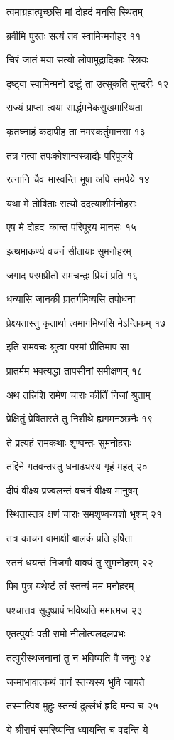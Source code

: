 त्वमाग्रहात्पृच्छसि मां दोहदं मनसि स्थितम्

ब्रवीमि पुरतः सत्यं तव स्वामिन्मनोहर ११

चिरं जातं मया सत्यो लोपामुद्रादिकाः स्त्रियः

दृष्ट्वा स्वामिन्मनो द्रष्टुं ता उत्सुकति सुन्दरीः १२

राज्यं प्राप्ता त्वया सार्द्धमनेकसुखमास्थिता

कृतघ्नाहं कदापीह ता नमस्कर्तुमानसा १३

तत्र गत्वा तपःकोशान्वस्त्राद्यैः परिपूजये

रत्नानि चैव भास्वन्ति भूषा अपि समर्पये १४

यथा मे तोषिताः सत्यो ददत्याशीर्मनोहराः

एष मे दोहदः कान्त परिपूरय मानसः १५

इत्थमाकर्ण्य वचनं सीतायाः सुमनोहरम्

जगाद परमप्रीतो रामचन्द्रः प्रियां प्रति १६

धन्यासि जानकी प्रातर्गमिष्यसि तपोधनाः

प्रेक्ष्यतास्तु कृतार्था त्वमागमिष्यसि मेऽन्तिकम् १७

इति रामवचः श्रुत्वा परमां प्रीतिमाप सा

प्रातर्मम भवत्यद्धा तापसीनां समीक्षणम् १८

अथ तन्निशि रामेण चाराः कीर्तिं निजां श्रुताम्

प्रेक्षितुं प्रेषितास्ते तु निशीथे ह्यगमनञ्छनैः १९

ते प्रत्यहं रामकथाः शृण्वन्तः सुमनोहराः

तद्दिने गतवन्तस्तु धनाढ्यस्य गृहं महत् २०

दीपं वीक्ष्य प्रज्वलन्तं वचनं वीक्ष्य मानुषम्

स्थितास्तत्र क्षणं चाराः समशृण्वन्यशो भृशम् २१

तत्र काचन वामाक्षी बालकं प्रति हर्षिता

स्तनं धयन्तं निजगौ वाक्यं तु सुमनोहरम् २२

पिब पुत्र यथेष्टं त्वं स्तन्यं मम मनोहरम्

पश्चात्तव सुदुष्प्रापं भविष्यति ममात्मज २३

एतत्पुर्याः पती रामो नीलोत्पलदलप्रभः

तत्पुरीस्थजनानां तु न भविष्यति वै जनुः २४

जन्माभावात्कथं पानं स्तन्यस्य भुवि जायते

तस्मात्पिब मुहुः स्तन्यं दुर्ल्लभं हृदि मन्य च २५

ये श्रीरामं स्मरिष्यन्ति ध्यायन्ति च वदन्ति ये

